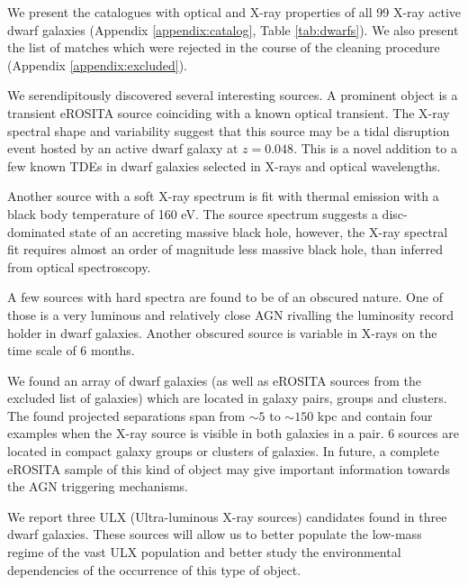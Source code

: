 \documentclass[fleqn,usenatbib]{mnras}
\newcommand{\sbyk}[1]{\textcolor{OliveGreen}{{SB: \bf||#1||}}}
\newcommand{\mg}[1]{\textcolor{blue}{{MG: \bf||#1||}}}
\begin{document}
We present the catalogues with optical and X-ray properties of all 99 X-ray active dwarf galaxies (Appendix  \ref{appendix:catalog}, Table \ref{tab:dwarfs}). We also present the list of matches which were rejected in the course of the cleaning procedure (Appendix \ref{appendix:excluded}).

We serendipitously discovered several interesting sources. A prominent object is a transient eROSITA source coinciding with a known optical transient. The X-ray spectral shape and variability suggest that this source may be a tidal disruption event hosted by an active dwarf galaxy at $z=0.048$. This is a novel addition to a few known TDEs in dwarf galaxies selected in X-rays and optical wavelengths. 

Another source with a soft X-ray spectrum is fit with thermal emission with a black body temperature of 160 eV. The source spectrum suggests a disc-dominated state of an accreting massive black hole, however, the X-ray spectral fit requires almost an order of magnitude less massive black hole, than inferred from optical spectroscopy.

A few sources with hard spectra are found to be of an obscured nature. One of those is a very luminous and relatively close AGN rivalling the luminosity record holder in dwarf galaxies. Another obscured source is variable in X-rays on the time scale of 6 months.


We found an array of dwarf galaxies (as well as eROSITA sources from the excluded list of galaxies) which are located in galaxy pairs, groups and clusters.  The found projected separations span from $\sim5$ to $\sim150$ kpc and contain four examples when the X-ray source is visible in both galaxies in a pair. 6 sources are located in compact galaxy groups or clusters of galaxies. In future, a complete eROSITA sample of this kind of object may give important information towards the AGN triggering mechanisms. 

We report three ULX (Ultra-luminous X-ray sources) candidates found in three dwarf galaxies. These sources will allow us to better populate  the low-mass regime of the vast ULX population and  better study the environmental dependencies of the occurrence of this type of object. 


\end{document}
